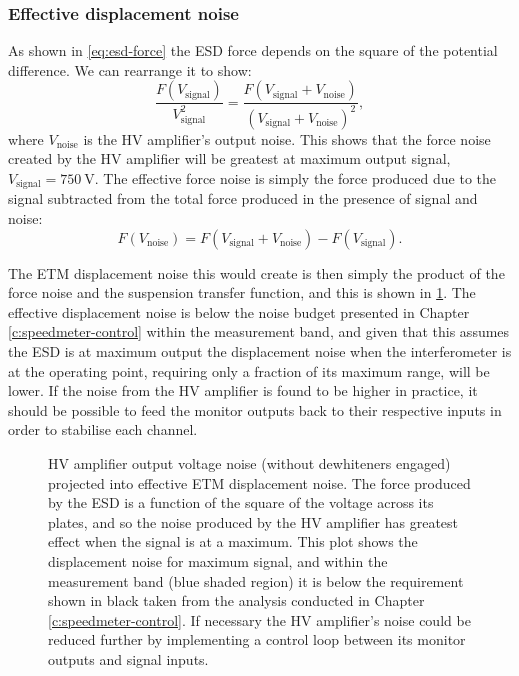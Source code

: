 \subsubsection{Effective displacement noise}
As shown in \cref{eq:esd-force} the \gls{ESD} force depends on the square of the potential difference. We can rearrange it to show:
\begin{equation}
  \frac{F \left( V_{\text{signal}} \right)}{V_{\text{signal}}^2} = \frac{F \left( V_{\text{signal}} + V_{\text{noise}} \right)}{\left( V_{\text{signal}} + V_{\text{noise}} \right)^2},
\end{equation}
where $V_{\text{noise}}$ is the \gls{HV} amplifier's output noise. This shows that the force noise created by the \gls{HV} amplifier will be greatest at maximum output signal, $V_{\text{signal}} = \SI{750}{\volt}$. The effective force noise is simply the force produced due to the signal subtracted from the total force produced in the presence of signal and noise:
\begin{equation}
  F \left( V_{\text{noise}} \right) = F \left( V_{\text{signal}} + V_{\text{noise}} \right) - F \left( V_{\text{signal}} \right).
\end{equation}

The \gls{ETM} displacement noise this would create is then simply the product of the force noise and the suspension transfer function, and this is shown in \cref{fig:hv-amp-output-displacement-noise}. The effective displacement noise is below the noise budget presented in Chapter\,\ref{c:speedmeter-control} within the measurement band, and given that this assumes the \gls{ESD} is at maximum output the displacement noise when the interferometer is at the operating point, requiring only a fraction of its maximum range, will be lower. If the noise from the \gls{HV} amplifier is found to be higher in practice, it should be possible to feed the monitor outputs back to their respective inputs in order to stabilise each channel.

\begin{figure}
  \centering
  
  \caption[High voltage amplifier output projected end test mass displacement noise]{\gls{HV} amplifier output voltage noise (without dewhiteners engaged) projected into effective \gls{ETM} displacement noise. The force produced by the \gls{ESD} is a function of the square of the voltage across its plates, and so the noise produced by the \gls{HV} amplifier has greatest effect when the signal is at a maximum. This plot shows the displacement noise for maximum signal, and within the measurement band (blue shaded region) it is below the requirement shown in black taken from the analysis conducted in Chapter\,\ref{c:speedmeter-control}. If necessary the \gls{HV} amplifier's noise could be reduced further by implementing a control loop between its monitor outputs and signal inputs.}
  \label{fig:hv-amp-output-displacement-noise}
\end{figure}

